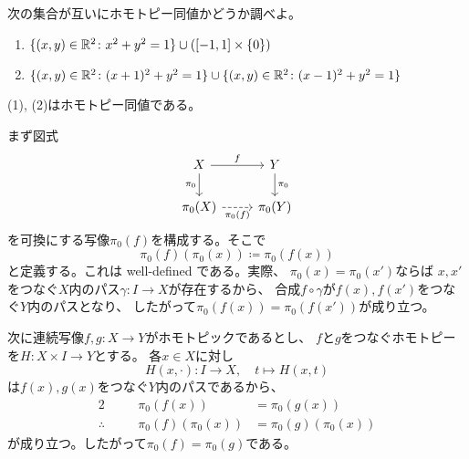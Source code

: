 \documentclass[report]{jlreq}
\begin{document}
\begin{problem}[幾何学II 2.4]
    次の集合が互いにホモトピー同値かどうか調べよ。
    \begin{enumerate}
        \item $\{ (x, y) \in \mathbb{R}^2 \colon x^2 + y^2 = 1 \}
            \cup ([-1, 1] \times \{ 0 \})$
        \item $\{ (x, y) \in \mathbb{R}^2 \colon (x + 1)^2 + y^2 = 1 \}
            \cup \{ (x, y) \in \mathbb{R}^2 \colon (x - 1)^2 + y^2 = 1 \}$
    \end{enumerate}
\end{problem}

\begin{answer}
    (1), (2)はホモトピー同値である。\TODO{}
\end{answer}


\begin{answer}
    まず図式
    \begin{equation}
        \begin{tikzcd}
            X \ar{r}{f} \ar{d}[swap]{\pi_0}
                & Y \ar{d}{\pi_0} \\
            \pi_0(X) \ar[dashed]{r}[swap]{\pi_0(f)}
                & \pi_0(Y)
        \end{tikzcd}
    \end{equation}
    を可換にする写像$\pi_0(f)$を構成する。そこで
    \begin{equation}
        \pi_0(f)(\pi_0(x)) \coloneqq \pi_0(f(x))
    \end{equation}
    と定義する。これは well-defined である。実際、
    $\pi_0(x) = \pi_0(x')$ならば
    $x, x'$をつなぐ$X$内のパス$\gamma \colon I \to X$が存在するから、
    合成$f \circ \gamma$が$f(x), f(x')$をつなぐ$Y$内のパスとなり、
    したがって$\pi_0(f(x)) = \pi_0(f(x'))$が成り立つ。

    次に連続写像$f, g \colon X \to Y$がホモトピックであるとし、
    $f$と$g$をつなぐホモトピーを$H \colon X \times I \to Y$とする。
    各$x \in X$に対し
    \begin{equation}
        H(x, \cdot) \colon I \to X, \quad
        t \mapsto H(x, t)
    \end{equation}
    は$f(x), g(x)$をつなぐ$Y$内のパスであるから、
    \begin{alignat}{2}
        && \pi_0(f(x)) &= \pi_0(g(x)) \\
        \therefore \quad && \pi_0(f)(\pi_0(x)) &= \pi_0(g)(\pi_0(x))
    \end{alignat}
    が成り立つ。したがって$\pi_0(f) = \pi_0(g)$である。
\end{answer}
\end{document}
